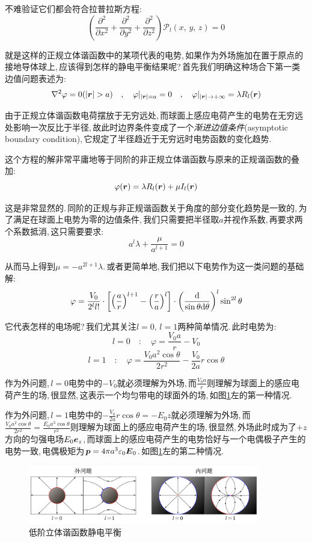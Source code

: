 不难验证它们都会符合拉普拉斯方程:
\[\left(\frac{\partial^2}{\partial x^2}+\frac{\partial^2}{\partial y^2}+\frac{\partial^2}{\partial z^2}\right)\mathcal{P}_l(x,\,y,\,z)=0\]

就是这样的正规立体谐函数中的某项代表的电势,\,如果作为外场施加在置于原点的接地导体球上,\,应该得到怎样的静电平衡结果呢?\,首先我们明确这种场合下第一类边值问题表述为:
\[\nabla^2\varphi=0(|\bs{r}|>a)\quad ,\quad \varphi|_{|\bs{r}|=a}=0 \quad ,\quad \varphi|_{|\bs{r}|\to+ \infty}=\lambda R_l(\bs{r})\]

由于正规立体谐函数电荷摆放于无穷远处,\,而球面上感应电荷产生的电势在无穷远处影响一次反比于半径,\,故此时边界条件变成了一个\emph{渐进边值条件}(asymptotic boundary condition),\,它规定了半径趋近于无穷远时电势函数的变化趋势.

这个方程的解非常平庸地等于同阶的非正规立体谐函数与原来的正规谐函数的叠加:
\[\varphi(\boldsymbol{r})=\lambda R_l(\boldsymbol{r})+\mu I_l(\boldsymbol{r})\]

这是非常显然的.\,同阶的正规与非正规谐函数关于角度的部分变化趋势是一致的,\,为了满足在球面上电势为零的边值条件,\,我们只需要把半径取$a$并视作系数,\,再要求两个系数抵消,\,这只需要要求:
\[a^l\lambda+\frac{\mu}{a^{l+1}}=0\]

从而马上得到$\mu=-a^{2l+1}\lambda$.\,或者更简单地,\,我们把以下电势作为这一类问题的基础解:
\[\varphi=\frac{V_0}{2^l l!}\cdot\left[\left(\frac{a}{r}\right)^{l+1}-\left(\frac{r}{a}\right)^l\right]\cdot\left(\frac{\textrm{d}}{\sin\theta\textrm{d} \theta}\right)^l\sin^{2l}\theta\]

它代表怎样的电场呢?\,我们尤其关注$l=0,\,l=1$两种简单情况.\,此时电势为:
\[l=0\quad:\quad\varphi=\frac{V_0 a}{r}-V_0\]
\[l=1\quad:\quad\varphi=\frac{V_0 a^2\cos\theta}{2r^2}-\frac{V_0}{2a}r\cos\theta\]

作为外问题,\,$l=0$电势中的$-V_0$就必须理解为外场,\,而$\frac{V_0 a}{r}$则理解为球面上的感应电荷产生的场,\,很显然,\,这表示一个均匀带电的球面外的场,\,如图\ref{fig:7-1-23}左的第一种情况.

作为外问题,\,$l=1$电势中的$-\frac{V_0}{2a}r\cos\theta=-E_0 z$就必须理解为外场,\,而$\frac{V_0 a^2\cos\theta}{2r^2}=\frac{E_0 a^3\cos\theta}{r^2}$则理解为球面上的感应电荷产生的场,\,很显然,\,外场此时成为了$+z$方向的匀强电场$E_0\boldsymbol{e}_z$,\,而球面上的感应电荷产生的电势恰好与一个电偶极子产生的电势一致,\,电偶极矩为$\boldsymbol{p}=4\pi a^3\varepsilon_0\boldsymbol{E}_0$.\,如图\ref{fig:7-1-23}左的第二种情况.

\begin{figure}[H]
\centering
\includegraphics[width=0.9\textwidth]{image/7-1-23.png}
\caption{低阶立体谐函数静电平衡}\label{fig:7-1-23}
\end{figure}

